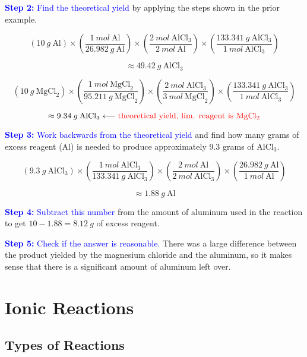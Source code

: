 \documentclass[a4paper, 12pt]{article}
\begin{document}
\textcolor{blue}{\textbf{Step 2:} Find the theoretical yield} by applying the steps shown in the prior example.

$$(10 \: g \: \text{Al}) \times \left(\frac{1 \: mol \: \text{Al}}{26.982 \: g \: \text{Al}}\right) \times \left(\frac{2 \: mol \: \text{AlCl}_3}{2 \: mol \: \text{Al}}\right) \times \left(\frac{133.341 \: g \: \text{AlCl}_3}{1 \: mol \: \text{AlCl}_3}\right)$$

$$ \approx 49.42 \: g \: \text{AlCl}_3$$

$$(10 \: g \: \text{MgCl}_2) \times \left(\frac{1 \: mol \: \text{MgCl}_2}{95.211 \: g \: \text{MgCl}_2}\right) \times \left(\frac{2 \: mol \: \text{AlCl}_3}{3 \: mol \: \text{MgCl}_2}\right) \times \left(\frac{133.341 \: g \: \text{AlCl}_3}{1 \: mol \: \text{AlCl}_3}\right)$$

$$ \approx 9.34 \: g \: \text{AlCl}_3 \longleftarrow \text{\textcolor{red}{theoretical yield, lim. reagent is MgCl$_2$}}$$

\textcolor{blue}{\textbf{Step 3:} Work backwards from the theoretical yield} and find how many grams of excess reagent (Al) is needed to produce approximately 9.3 grams of AlCl$_3$.

$$(9.3 \: g \: \text{AlCl}_3) \times \left(\frac{1 \: mol \: \text{AlCl}_3}{133.341 \: g \: \text{AlCl}_3}\right) \times \left(\frac{2 \: mol \: \text{Al}}{2 \: mol \: \text{AlCl}_3}\right) \times \left(\frac{26.982 \: g \: \text{Al}}{1 \: mol \: \text{Al}}\right)$$

$$\approx 1.88 \: g \: \text{Al}$$

\textcolor{blue}{\textbf{Step 4:} Subtract this number} from the amount of aluminum used in the reaction to get $10 - 1.88 = \boxed{8.12 \: g}$ of excess reagent.

\textcolor{blue}{\textbf{Step 5:} Check if the answer is reasonable.} There was a large difference between the product yielded by the magnesium chloride and the aluminum, so it makes sense that there is a significant amount of aluminum left over.

\section{Ionic Reactions}

\subsection*{Types of Reactions} \label{types of reactions}
\end{document}
